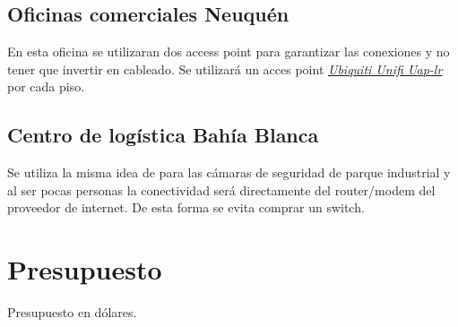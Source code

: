\documentclass[11pt]{article}
\begin{document}
 



    \subsection{Oficinas comerciales Neuquén}

    En esta oficina se utilizaran dos access point para garantizar las conexiones y no tener que invertir en cableado. Se utilizará un acces point 
    \href{https://www.mercadolibre.com.ar/access-point-interior-ubiquiti-networks-unifi-ac-lr-ap-uap-ac-lr-blanco-1-unidad/p/MLA7953376?pdp_filters=category:MLA1700#searchVariation=MLA7953376&position=1&type=product&tracking_id=933ff74a-93c5-4a58-9a31-9fe5a3c5746e}{\textit{Ubiquiti Unifi Uap-lr}}
    por cada piso.

    \subsection{Centro de logística Bahía Blanca}
    Se utiliza la misma idea de para las cámaras de seguridad de parque industrial y al ser pocas personas la conectividad será directamente del router/modem 
    del proveedor de internet. De esta forma se evita comprar un switch. 
    

    \section{Presupuesto}

    \begin{table}[H]
        \centering
        
        \caption{Presupuesto en dólares.}
    \end{table}

    
\end{document}
